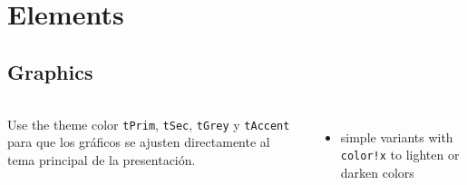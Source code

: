 \section{Elements}
\subsection{Graphics}
\begin{frame}{\insertsectionhead}
  \framesubtitle{\insertsubsectionhead}
  \begin{columns}[c, onlytextwidth]
    Use the theme color \texttt{tPrim}, \texttt{tSec}, \texttt{tGrey} y
    \texttt{tAccent} para que los gráficos se ajusten directamente al tema principal de la presentación.
    \vfill
    \begin{itemize}
      \item simple variants with \texttt{color!x} to lighten or darken colors
    \end{itemize}
    \hfill
    \center
  \end{columns}
\end{frame}

